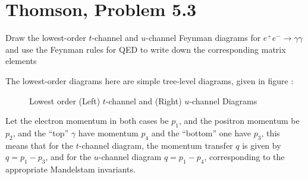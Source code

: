 \documentclass[12pt]{article}
\begin{document}
\section{Thomson, Problem 5.3}
\begin{problem}
  Draw the lowest-order $t$-channel and $u$-channel Feynman diagrams for $e^+e^-\to\gamma\gamma$ and use the Feynman rules for QED to write down the corresponding matrix elements
\end{problem}
The lowest-order diagrams here are simple tree-level diagrams, given in figure :
\begin{figure}[H]
  \centering
  \caption{Lowest order (Left) $t$-channel and (Right) $u$-channel Diagrams}
  \label{fig:diagrams}
\end{figure}
Let the electron momentum in both cases be $p_1$, and the positron momentum  be $p_2$, and the ``top'' $\gamma$ have momentum $p_4$ and the ``bottom'' one have $p_3$, this means that for the $t$-channel diagram, the momentum transfer $q$ is given by $q=p_1-p_3$, and for the $u$-channel diagram $q=p_1-p_4$, corresponding to the appropriate Mandelstam invariants.
\end{document}
